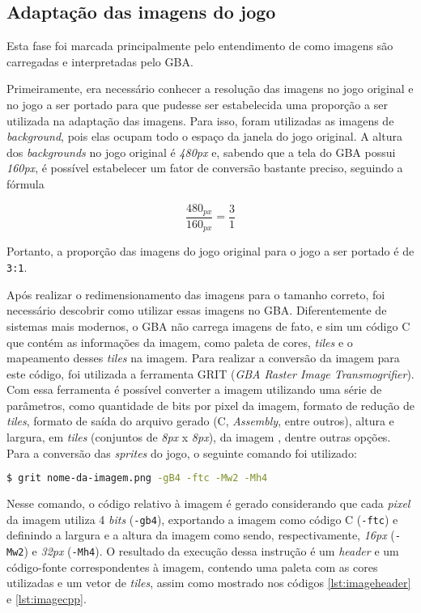 \subsection{Adaptação das imagens do jogo} \label{adapak}

Esta fase foi marcada principalmente pelo entendimento de como imagens são carregadas e interpretadas pelo GBA.

Primeiramente, era necessário conhecer a resolução das imagens no jogo original e no jogo a ser portado para que pudesse ser estabelecida uma proporção a ser utilizada na adaptação das imagens. Para isso, foram utilizadas as imagens de \textit{background}, pois elas ocupam todo o espaço da janela do jogo original. A altura dos \textit{backgrounds} no jogo original é \textit{480px} e, sabendo que a tela do GBA possui \textit{160px}, é possível estabelecer um fator de conversão bastante preciso, seguindo a fórmula

\begin{equation}
\label{Cálculo da proporção das imagens do jogo}
\frac{480_{px}}{160_{px}} = \frac{3}{1}
\end{equation}

Portanto, a proporção das imagens do jogo original para o jogo a ser portado é de \texttt{3:1}.

Após realizar o redimensionamento das imagens para o tamanho correto, foi necessário descobrir como utilizar essas imagens no GBA. Diferentemente de sistemas mais modernos, o GBA não carrega imagens de fato, e sim um código C que contém as informações da imagem, como paleta de cores, \textit{tiles} e o mapeamento desses \textit{tiles} na imagem. Para realizar a conversão da imagem para este código, foi utilizada a ferramenta GRIT (\textit{GBA Raster Image Transmogrifier}). Com essa ferramenta é possível converter a imagem utilizando uma série de parâmetros, como quantidade de bits por pixel da imagem, formato de redução de \textit{tiles}, formato de saída do arquivo gerado (C, \textit{Assembly}, entre outros), altura e largura, em \textit{tiles} (conjuntos de \textit{8px} x \textit{8px}), da imagem , dentre outras opções. Para a conversão das \textit{sprites} do jogo, o seguinte comando foi utilizado:

\begin{lstlisting}[language=bash,caption={Comando para conversão das imagens em código}]
$ grit nome-da-imagem.png -gB4 -ftc -Mw2 -Mh4
\end{lstlisting}

Nesse comando, o código relativo à imagem é gerado considerando que cada \textit{pixel} da imagem utiliza 4 \textit{bits} (\texttt{-gb4}), exportando a imagem como código C (\texttt{-ftc}) e definindo a largura e a altura da imagem como sendo, respectivamente, \textit{16px} (\texttt{-Mw2}) e \textit{32px} (\texttt{-Mh4}). O resultado da execução dessa instrução é um \textit{header} e um código-fonte correspondentes à imagem, contendo uma paleta com as cores utilizadas e um vetor de \textit{tiles}, assim como mostrado nos códigos \ref{lst:imageheader} e \ref{lst:imagecpp}.


